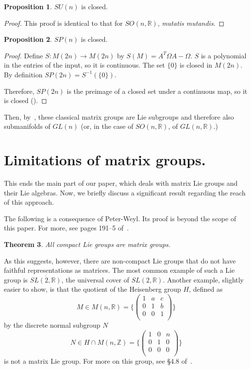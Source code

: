 \documentclass[12pt]{article}
\newcommand{\R}{\mathbb{R}}
\newcommand{\Z}{\mathbb{Z}}
\newcommand{\son}{SO (n, \R)}
\newcommand{\Om}{\Omega}
\newtheorem{them}{Theorem}[section]
\theoremstyle{definition}
\newtheorem{prop}[them]{Proposition}
\theoremstyle{definition}
\theoremstyle{definition}
\theoremstyle{definition}
\theoremstyle{definition}
\theoremstyle{definition}
\theoremstyle{definition}
\theoremstyle{definition}
\begin{document}
\begin{prop}
$SU(n)$ is closed.
\end{prop}
\begin{proof}
This proof is identical to that for $\son$,
\textit{mutatis mutandis}.
\end{proof}

\begin{prop}
$SP(n)$ is closed.
\end{prop}
\begin{proof}
\par{Define $S: M(2n) \to M(2n)$ by $S(M) =
A^T \Om A - \Om$. $S$ is a polynomial in the
entries of the input, so it is continuous. The
set $\{0\}$ is closed in $M(2n)$. By
definition $SP(2n) = S^{-1}(\{0\})$.}

\par{Therefore, $SP(2n)$ is the preimage of a
closed set under a continuous map, so it is
closed (\cite{Heuber}).}
\end{proof}

\par{Then, by~, these classical
matrix groups are Lie subgroups and therefore also
submanifolds of $GL(n)$ (or, in the case of
$\son$, of $GL(n, \R)$.)}

\section{Limitations of matrix groups.}\label{sec:lim}
\par{This ends the main part of our paper, which deals with matrix Lie groups and their Lie algebras. Now, we briefly discuss a significant result regarding the reach of this approach.}

\vspace{6pt}
\par{The following is a consequence of Peter-Weyl.
Its proof is beyond the scope of this paper. For
more, see pages 191--5 of~\cite{Knapp}.}

\begin{them}
All compact Lie groups are matrix groups.
\end{them}

\par{As this suggests, however, there are
non-compact Lie groups that do not have faithful
representations as matrices. The most common
example of such a Lie group is $\overline{SL(2, \R)}$, the universal cover
of $SL(2, \R)$. Another example, slightly easier to
show, is that the quotient of the Heisenberg group $H$,
defined as
\[
M \in M(n, \R) = \Bigg\{
\begin{pmatrix}
    1&a&c\\
    0&1&b\\
    0&0&1\\
\end{pmatrix} 
\Bigg\} 
\] 
by the discrete normal subgroup $N$
\[
    N \in H \cap M(n,\Z) = \Bigg\{
\begin{pmatrix}
    1&0&n\\
    0&1&0\\
    0&0&0\\
\end{pmatrix} 
\Bigg\}
\] 
is not a matrix Lie group. For more on this group, see §4.8
of~\cite{Hall}.}
\end{document}
